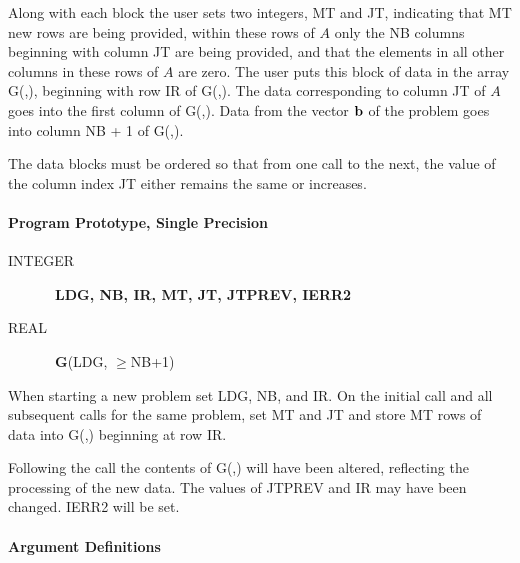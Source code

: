 \documentclass[twoside]{MATH77}
\begin{document}
Along with each block the user sets two integers, MT and JT, indicating that
MT new rows are being provided, within these rows of $A$ only the NB columns
beginning with column JT are being provided, and that the elements in all
other columns in these rows of $A$ are zero. The user puts this block of
data in the array G(,), beginning with row IR of G(,). The data
corresponding to column JT of $A$ goes into the first column of G(,). Data
from the vector ${\bf b}$ of the problem goes into column NB + 1 of G(,).

The data blocks must be ordered so that from one call to the next, the value
of the column index JT either remains the same or increases.

\paragraph{Program Prototype, Single Precision}

\begin{description}
\item[INTEGER]  \ {\bf LDG, NB, IR, MT, JT, JTPREV, IERR2}

\item[REAL]  \ {\bf G}(LDG, $\geq $NB+1)
\end{description}

When starting a new problem set LDG, NB, and IR. On the initial call and all
subsequent calls for the same problem, set MT and JT and store MT rows of
data into G(,) beginning at row IR.

\begin{center}
\end{center}

Following the call the contents of G(,) will have been altered, reflecting
the processing of the new data. The values of JTPREV and IR may have been
changed. IERR2 will be set.

\paragraph{Argument Definitions}
\end{document}
